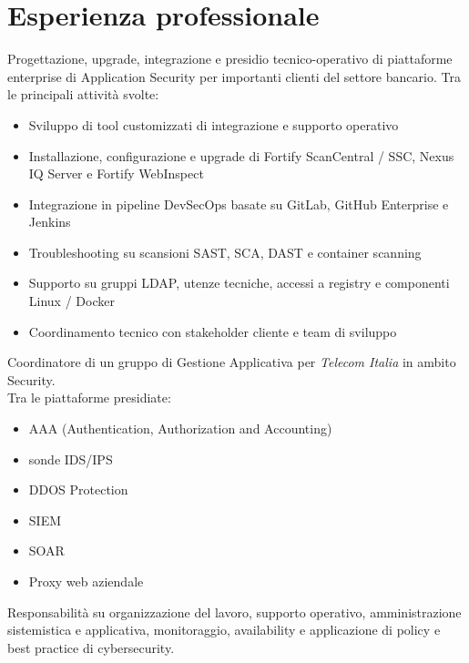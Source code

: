 \section{Esperienza professionale}
        {Progettazione, upgrade, integrazione e presidio tecnico-operativo di piattaforme enterprise di Application Security per importanti clienti del settore bancario. Tra le principali attività svolte:
          \begin{itemize}
          \item Sviluppo di tool customizzati di integrazione e supporto operativo
          \item Installazione, configurazione e upgrade di Fortify ScanCentral / SSC, Nexus IQ Server e Fortify WebInspect
          \item Integrazione in pipeline DevSecOps basate su GitLab, GitHub Enterprise e Jenkins
          \item Troubleshooting su scansioni SAST, SCA, DAST e container scanning
          \item Supporto su gruppi LDAP, utenze tecniche, accessi a registry e componenti Linux / Docker
          \item Coordinamento tecnico con stakeholder cliente e team di sviluppo
          \end{itemize}}
\vspace{3mm}
        {Coordinatore di un gruppo di Gestione Applicativa per \emph{Telecom Italia} in ambito Security.\\ Tra le piattaforme presidiate:
          \begin{itemize}
          \item AAA (Authentication, Authorization and Accounting)
          \item sonde IDS/IPS
          \item DDOS Protection
          \item SIEM
          \item SOAR
          \item Proxy web aziendale
          \end{itemize}
          Responsabilità su organizzazione del lavoro, supporto operativo, amministrazione sistemistica e applicativa, monitoraggio, availability e applicazione di policy e best practice di cybersecurity.}
\vspace{3mm}
